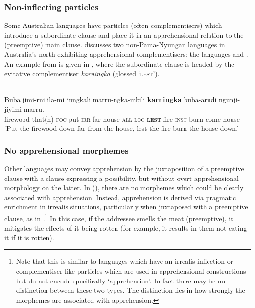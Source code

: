 \documentclass[output=paper,colorlinks,citecolor=brown]{langscibook}
\begin{document}
\subsubsection{Non-inflecting particles}

Some Australian languages have particles (often complementisers) which introduce a subordinate clause and place it in an apprehensional relation to the (preemptive) main clause. \citet{zester_semantics_2010} discusses two non-Pama-Nyungan languages in Australia's north exhibiting apprehensional complementisers: the  languages  \citep[210]{nordlinger_grammar_1998} and  \citep{pensalfini_grammar_2003}. An example from  is given in , where the subordinate clause is headed by the evitative complementiser \textit{karningka} (glossed `\textsc{lest}').

\ea 
{} {\citealt[120]{pensalfini_grammar_2003}} \\
\gll Buba jimi-rni ila-mi jungkali marru-ngka-mbili \textbf{karningka}  buba-arndi ngunji-jiyimi marru. \\
firewood that(n)-\textsc{foc} put-\textsc{irr} far house-\textsc{all-loc} \textbf{\textsc{lest}} fire-\textsc{inst} burn-come house \\
\glt `Put the firewood down far from the house, lest the fire burn the house down.'
\label{ex:bro12}
\z

\subsubsection{No apprehensional morphemes}

Other languages may convey apprehension by the juxtaposition of a preemptive clause with a clause expressing a possibility, but without overt apprehensional morphology on the latter. In  (), there are no morphemes which could be clearly associated with apprehension. Instead, apprehension is derived via pragmatic enrichment in irrealis situations, particularly when juxtaposed with a preemptive clause, as in .\footnote{Note that this is similar to languages which have an irrealis inflection or complementiser-like particles which are used in apprehensional constructions but do not encode specifically `apprehension'. In fact there may be no distinction between these two types. The distinction lies in how strongly the morphemes are associated with apprehension.} In this case, if the addressee smells the meat (preemptive), it mitigates the effects of it being rotten (for example, it results in them not eating it if it is rotten).
\end{document}
